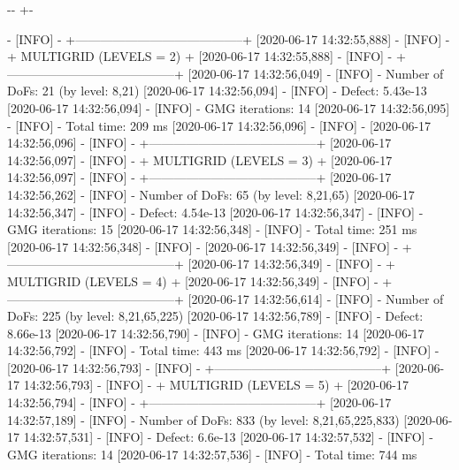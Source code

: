 \documentclass[letterpaper,10pt,english, openany]{sphinxmanual}
\newlength\nbsphinxcodecellspacing
\begin{document}
{

\kern-\sphinxverbatimsmallskipamount\kern-\baselineskip
\kern+\FrameHeightAdjust\kern-\fboxrule
\vspace{\nbsphinxcodecellspacing}

\begin{sphinxVerbatim}[commandchars=\\\{\}]
[2020-06-17 14:32:55,887] - [INFO] - +-----------------------------------------+
[2020-06-17 14:32:55,888] - [INFO] - +    MULTIGRID (LEVELS =  2)              +
[2020-06-17 14:32:55,888] - [INFO] - +-----------------------------------------+
[2020-06-17 14:32:56,049] - [INFO] - Number of DoFs: 21 (by level: 8,21)
[2020-06-17 14:32:56,094] - [INFO] - Defect:         5.43e-13
[2020-06-17 14:32:56,094] - [INFO] - GMG iterations: 14
[2020-06-17 14:32:56,095] - [INFO] - Total time:     209 ms
[2020-06-17 14:32:56,096] - [INFO] -
[2020-06-17 14:32:56,096] - [INFO] - +-----------------------------------------+
[2020-06-17 14:32:56,097] - [INFO] - +    MULTIGRID (LEVELS =  3)              +
[2020-06-17 14:32:56,097] - [INFO] - +-----------------------------------------+
[2020-06-17 14:32:56,262] - [INFO] - Number of DoFs: 65 (by level: 8,21,65)
[2020-06-17 14:32:56,347] - [INFO] - Defect:         4.54e-13
[2020-06-17 14:32:56,347] - [INFO] - GMG iterations: 15
[2020-06-17 14:32:56,348] - [INFO] - Total time:     251 ms
[2020-06-17 14:32:56,348] - [INFO] -
[2020-06-17 14:32:56,349] - [INFO] - +-----------------------------------------+
[2020-06-17 14:32:56,349] - [INFO] - +    MULTIGRID (LEVELS =  4)              +
[2020-06-17 14:32:56,349] - [INFO] - +-----------------------------------------+
[2020-06-17 14:32:56,614] - [INFO] - Number of DoFs: 225 (by level: 8,21,65,225)
[2020-06-17 14:32:56,789] - [INFO] - Defect:         8.66e-13
[2020-06-17 14:32:56,790] - [INFO] - GMG iterations: 14
[2020-06-17 14:32:56,792] - [INFO] - Total time:     443 ms
[2020-06-17 14:32:56,792] - [INFO] -
[2020-06-17 14:32:56,793] - [INFO] - +-----------------------------------------+
[2020-06-17 14:32:56,793] - [INFO] - +    MULTIGRID (LEVELS =  5)              +
[2020-06-17 14:32:56,794] - [INFO] - +-----------------------------------------+
[2020-06-17 14:32:57,189] - [INFO] - Number of DoFs: 833 (by level: 8,21,65,225,833)
[2020-06-17 14:32:57,531] - [INFO] - Defect:         6.6e-13
[2020-06-17 14:32:57,532] - [INFO] - GMG iterations: 14
[2020-06-17 14:32:57,536] - [INFO] - Total time:     744 ms

\end{sphinxVerbatim}}
\end{document}
